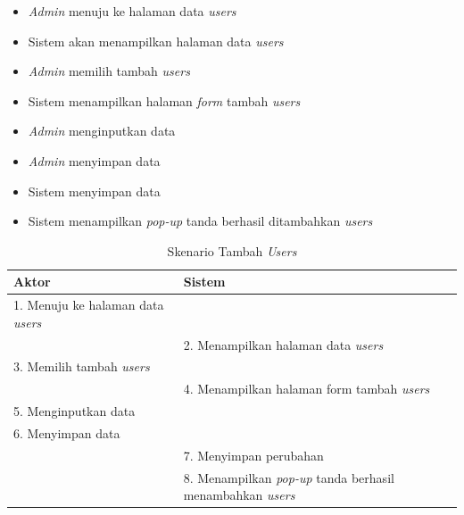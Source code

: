\begin{enumerate}
\begin{itemize}
	\item \textit{Admin} menuju ke halaman data \textit{users}
	\item Sistem akan menampilkan halaman data \textit{users}
	\item \textit{Admin} memilih tambah \textit{users}
	\item Sistem menampilkan halaman \textit{form} tambah \textit{users}
	\item \textit{Admin} menginputkan data
	\item \textit{Admin} menyimpan data
	\item Sistem menyimpan data
	\item Sistem menampilkan \textit{pop-up} tanda berhasil ditambahkan \textit{users}
	
\end{itemize}

\begin{table}
	\caption{Skenario Tambah \textit{Users}}
	\centering
	\begin{tabular}{ | l | p{65mm} |}
		\hline 
		\textbf{Aktor} & \textbf{Sistem} \\
		\hline
		
		1.	Menuju ke halaman data \textit{users} &  \\
		
		\hline
		
		&  2.	Menampilkan halaman data \textit{users} \\
		
		\hline
		
		3. Memilih tambah \textit{users} & \\
		
		\hline
		
		& 4.	Menampilkan halaman form tambah \textit{users} \\
		
		\hline
		
		5.	Menginputkan data  & \\
		\hline
		
		6.	Menyimpan data & \\
		\hline
		
		& 7.	Menyimpan perubahan \\
		\hline
		
		& 8.	Menampilkan \textit{pop-up} tanda berhasil menambahkan \textit{users} \\
		\hline
		
	\end{tabular}
\end{table}


\end{enumerate}
